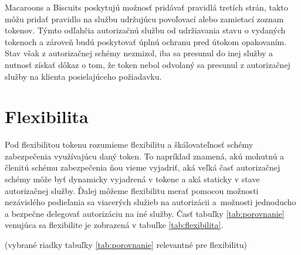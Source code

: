 Macaroons a Biscuits poskytujú možnosť pridávať pravidlá tretích strán, takto môžu pridať pravidlo na službu udržujúcu povoľovací alebo zamietací zoznam tokenov. Týmto odľahčia autorizačnú službu od udržiavania stavu o vydaných tokenoch a zároveň budú poskytovať úplnú ochranu pred útokom opakovaním. Stav však z autorizačnej schémy nezmizol, iba sa presunul do inej služby a nutnosť získať dôkaz o tom, že token nebol odvolaný sa presunul z autorizačnej služby na klienta posielajúceho požiadavku.


\section{Flexibilita}

Pod flexibilitou tokenu rozumieme flexibilitu a škálovateľnosť schémy zabezpečenia využívajúcu daný token. To napríklad znamená, akú mohutnú a členitú schému zabezpečenia ňou vieme vyjadriť, aká veľká časť autorizačnej schémy môže byť dynamicky vyjadrená v tokene a aká staticky v stave autorizačnej služby. Ďalej môžeme flexibilitu merať pomocou možnosti nezávislého podieľania sa viacerých služieb na autorizácii a~možnosti jednoducho a bezpečne delegovať autorizáciu na iné služby. Časť tabuľky \ref{tab:porovnanie} venujúca sa flexibilite je zobrazená v tabuľke \ref{tab:flexibilita}.

\begin{table}
  \begin{center}
    \caption{Flexibilita tokenov}(vybrané riadky tabuľky \ref{tab:porovnanie} relevantné pre flexibilitu)
    \label{tab:flexibilita} %

  \end{center}
\end{table}

